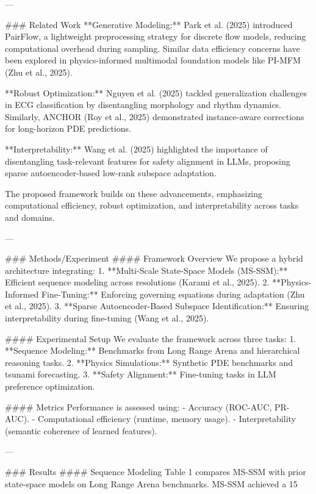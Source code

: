---

### Related Work  
**Generative Modeling:** Park et al. (2025) introduced PairFlow, a lightweight preprocessing strategy for discrete flow models, reducing computational overhead during sampling. Similar data efficiency concerns have been explored in physics-informed multimodal foundation models like PI-MFM (Zhu et al., 2025).  

**Robust Optimization:** Nguyen et al. (2025) tackled generalization challenges in ECG classification by disentangling morphology and rhythm dynamics. Similarly, ANCHOR (Roy et al., 2025) demonstrated instance-aware corrections for long-horizon PDE predictions.  

**Interpretability:** Wang et al. (2025) highlighted the importance of disentangling task-relevant features for safety alignment in LLMs, proposing sparse autoencoder-based low-rank subspace adaptation.  

The proposed framework builds on these advancements, emphasizing computational efficiency, robust optimization, and interpretability across tasks and domains.  

---

### Methods/Experiment  
#### Framework Overview  
We propose a hybrid architecture integrating:  
1. **Multi-Scale State-Space Models (MS-SSM):** Efficient sequence modeling across resolutions (Karami et al., 2025).  
2. **Physics-Informed Fine-Tuning:** Enforcing governing equations during adaptation (Zhu et al., 2025).  
3. **Sparse Autoencoder-Based Subspace Identification:** Ensuring interpretability during fine-tuning (Wang et al., 2025).  

#### Experimental Setup  
We evaluate the framework across three tasks:  
1. **Sequence Modeling:** Benchmarks from Long Range Arena and hierarchical reasoning tasks.  
2. **Physics Simulations:** Synthetic PDE benchmarks and tsunami forecasting.  
3. **Safety Alignment:** Fine-tuning tasks in LLM preference optimization.  

#### Metrics  
Performance is assessed using:  
- Accuracy (ROC-AUC, PR-AUC).  
- Computational efficiency (runtime, memory usage).  
- Interpretability (semantic coherence of learned features).  

---

### Results  
#### Sequence Modeling  
Table 1 compares MS-SSM with prior state-space models on Long Range Arena benchmarks. MS-SSM achieved a 15%

